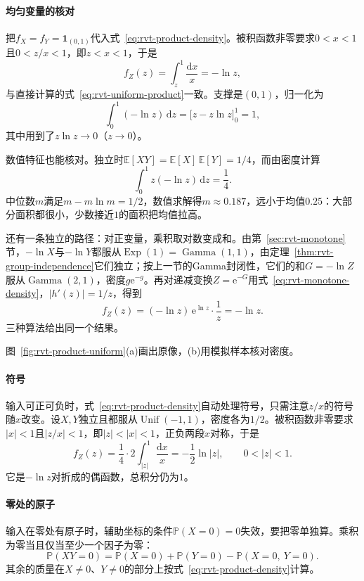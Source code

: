 \paragraph{均匀变量的核对}
把$f_X=f_Y=\mathbf{1}_{(0,1)}$代入式~\eqref{eq:rvt-product-density}。被积函数非零要求$0<x<1$且$0<z/x<1$，即$z<x<1$，于是
\[
 f_Z(z)=\int_z^1\frac{\mathrm{d}x}{x}=-\ln z ,
\]
与直接计算的式~\eqref{eq:rvt-uniform-product}一致。支撑是$(0,1)$，归一化为
\[
 \int_0^1(-\ln z)\,\mathrm{d}z=\bigl[z-z\ln z\bigr]_0^1=1 ,
\]
其中用到了$z\ln z\to0$（$z\to0$）。

数值特征也能核对。独立时$\mathbb{E}[XY]=\mathbb{E}[X]\,\mathbb{E}[Y]=1/4$，而由密度计算
\[
 \int_0^1z(-\ln z)\,\mathrm{d}z=\frac14 .
\]
中位数$m$满足$m-m\ln m=1/2$，数值求解得$m\approx0.187$，远小于均值$0.25$：大部分面积都很小，少数接近$1$的面积把均值拉高。

还有一条独立的路径：对正变量，乘积取对数变成和。由第~\ref{sec:rvt-monotone}节，$-\ln X$与$-\ln Y$都服从$\operatorname{Exp}(1)=\operatorname{Gamma}(1,1)$，由定理~\ref{thm:rvt-group-independence}它们独立；按上一节的Gamma封闭性，它们的和$G=-\ln Z$服从$\operatorname{Gamma}(2,1)$，密度$g\mathrm{e}^{-g}$。再对递减变换$Z=\mathrm{e}^{-G}$用式~\eqref{eq:rvt-monotone-density}，$\lvert h'(z)\rvert=1/z$，得到
\[
 f_Z(z)=(-\ln z)\,\mathrm{e}^{\ln z}\cdot\frac1z=-\ln z .
\]
三种算法给出同一个结果。

图~\ref{fig:rvt-product-uniform}(a)画出原像，(b)用模拟样本核对密度。

\paragraph{符号}
输入可正可负时，式~\eqref{eq:rvt-product-density}自动处理符号，只需注意$z/x$的符号随$x$改变。设$X,Y$独立且都服从$\operatorname{Unif}(-1,1)$，密度各为$1/2$。被积函数非零要求$\lvert x\rvert<1$且$\lvert z/x\rvert<1$，即$\lvert z\rvert<\lvert x\rvert<1$，正负两段$x$对称，于是
\[
 f_Z(z)=\frac14\cdot2\int_{\lvert z\rvert}^{1}\frac{\mathrm{d}x}{x}=-\frac12\ln\lvert z\rvert,\qquad 0<\lvert z\rvert<1 .
\]
它是$-\ln z$对折成的偶函数，总积分仍为$1$。

\paragraph{零处的原子}
输入在零处有原子时，辅助坐标的条件$\mathbb{P}(X=0)=0$失效，要把零单独算。乘积为零当且仅当至少一个因子为零：
\[
 \mathbb{P}(XY=0)=\mathbb{P}(X=0)+\mathbb{P}(Y=0)-\mathbb{P}(X=0,\ Y=0) .
\]
其余的质量在$X\neq0$、$Y\neq0$的部分上按式~\eqref{eq:rvt-product-density}计算。

